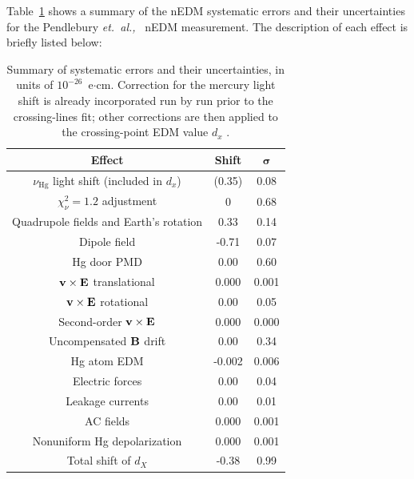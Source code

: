Table~\ref{tab:nedmsystematics} shows a summary of the nEDM systematic
errors and their uncertainties for the Pendlebury
{\it{et.~al.,}}~\cite{Pendlebury2015} nEDM measurement. The
description of each effect is briefly listed below:

\begin{table}[h!]
  \begin{center}
    \begin{tabular}{|c||c|c|}
      \hline
      \bf{Effect} & \bf{Shift} & $\boldsymbol{\sigma}$ \\ \hline \hline
      $\nu_{\mathrm{Hg}}$ light shift (included in $d_x$) & (0.35) & 0.08 \\ \hline
      $\chi_{\nu}^2 = 1.2$ adjustment & 0 & 0.68 \\ \hline
      Quadrupole fields and Earth's rotation & 0.33 & 0.14 \\ \hline
      Dipole field & -0.71 & 0.07 \\ \hline
      Hg door PMD & 0.00 & 0.60 \\ \hline
      $\bf{v} \times \bf{E}$ translational & 0.000 & 0.001 \\\hline
      $\bf{v} \times \bf{E}$ rotational & 0.00 & 0.05 \\ \hline
      Second-order $\bf{v} \times \bf{E}$ & 0.000 & 0.000 \\ \hline
      Uncompensated $\bf{B}$ drift & 0.00 & 0.34 \\ \hline
      Hg atom EDM & -0.002 & 0.006 \\ \hline
      Electric forces & 0.00 & 0.04 \\ \hline
      Leakage currents & 0.00 & 0.01 \\ \hline
      AC fields & 0.000 & 0.001 \\ \hline
      Nonuniform Hg depolarization & 0.000 & 0.001 \\ \hline
      Total shift of $d_X$ & -0.38 & 0.99 \\ \hline
    \end{tabular}
  \end{center}
  \caption[Summary of systematic errors for the most recent nEDM
  measurement]{\cite{Pendlebury2015}Summary of systematic errors and
    their uncertainties, in units of $10^{-26}$~e$\cdot$cm. Correction
    for the mercury light shift is already incorporated run by run
    prior to the crossing-lines fit; other corrections are then
    applied to the crossing-point EDM value $d_x$ .}
  \label{tab:nedmsystematics}
\end{table}

